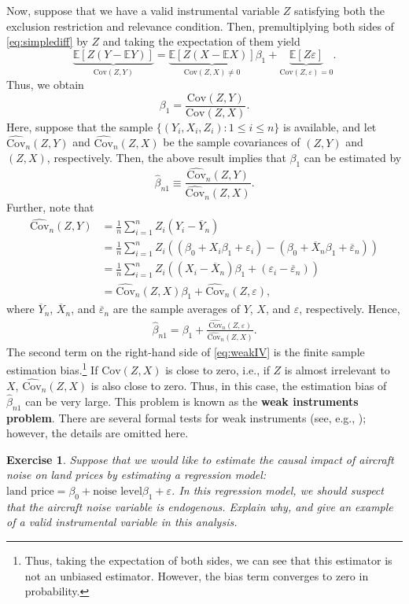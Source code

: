 \documentclass[10.5pt, A4paper, openany, uplatex]{book}
\newcommand{\eps}{\varepsilon}
\newcommand{\E}{\mathbb{E}}
\newcommand{\Cov}{\mathrm{Cov}}
\renewcommand{\hat}{\widehat}
\renewcommand{\bar}{\overline}
\newtheorem{exercise}[theorem]{Exercise}
\numberwithin{equation}{section}
\begin{document}
Now, suppose that we have a valid instrumental variable $Z$ satisfying both the exclusion restriction and relevance condition.
Then, premultiplying both sides of \eqref{eq:simplediff} by $Z$ and taking the expectation of them yield
\[
	\underbrace{\E[Z (Y - \E Y)]}_{\Cov(Z, Y)} = \underbrace{\E[Z (X - \E X)]}_{\Cov(Z, X) \neq 0} \beta_1 + \underbrace{\E[Z \eps]}_{\Cov(Z, \eps) = 0}.
\]
Thus, we obtain
\[
	\beta_1 = \frac{\Cov(Z, Y)}{\Cov(Z, X)}.
\]
Here, suppose that the sample $\{(Y_i, X_i, Z_i): 1 \le i \le n\}$ is available, and let $\hat{\Cov}_n(Z, Y)$ and $\hat{\Cov}_n(Z, X)$ be the sample covariances of $(Z, Y)$ and $(Z, X)$, respectively.
Then, the above result implies that $\beta_1$ can be estimated by
\[
	\hat{\beta}_{n1} \equiv \frac{\hat{\Cov}_n(Z, Y)}{\hat{\Cov}_n(Z, X)}.
\] 
Further, note that 
\begin{align*}
	\hat{\Cov}_n(Z, Y) 
	& = \frac{1}{n}\sum_{i = 1}^n Z_i (Y_i - \bar Y_n) \\
	& = \frac{1}{n}\sum_{i = 1}^n Z_i ((\beta_0 + X_i\beta_1 + \eps_i) - (\beta_0 + \bar X_n \beta_1 + \bar \eps_n))\\ 
	& =\frac{1}{n}\sum_{i = 1}^n Z_i ((X_i - \bar X_n) \beta_1 + (\eps_i - \bar \eps_n))\\ 
	& = \hat{\Cov}_n(Z, X)\beta_1 + \hat{\Cov}_n(Z, \eps),
\end{align*}
where $\bar Y_n$, $\bar X_n$, and $\bar \eps_n$ are the sample averages of $Y$, $X$, and $\eps$, respectively.
Hence, 
\begin{align}\label{eq:weakIV}
	\hat{\beta}_{n1} = \beta_1 + \frac{\hat{\Cov}_n(Z, \eps)}{\hat{\Cov}_n(Z, X)}.
\end{align}
The second term on the right-hand side of \eqref{eq:weakIV} is the finite sample estimation bias.\footnote{
	Thus, taking the expectation of both sides, we can see that this estimator is not an unbiased estimator.
	However, the bias term converges to zero in probability.
}
If $\Cov(Z,X)$ is close to zero, i.e., if $Z$ is almost irrelevant to $X$, $\hat{\Cov}_n(Z, X)$ is also close to zero.
Thus, in this case, the estimation bias of $\hat{\beta}_{n1}$ can be very large.
This problem is known as the \textbf{weak instruments problem}. 
There are several formal tests for weak instruments (see, e.g., \cite{stock2005testing}); however, the details are omitted here.

\begin{framed}
\begin{exercise}\upshape
	Suppose that we would like to estimate the causal impact of aircraft noise on land prices by estimating a regression model: $\text{land price} = \beta_0 + \text{noise level}\beta_1 + \eps$.
	In this regression model, we should suspect that the aircraft noise variable is endogenous. 
	Explain why, and give an example of a valid instrumental variable in this analysis.
\end{exercise}
\end{framed}
\end{document}
